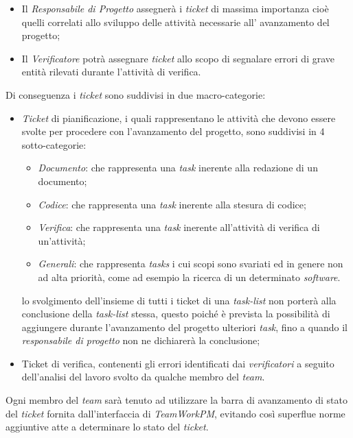 \begin{itemize}
\item Il \textit{Responsabile di Progetto} assegnerà i \textit{ticket} di massima importanza cioè quelli correlati allo sviluppo delle attività necessarie all' avanzamento del progetto;
\item Il \textit{Verificatore} potrà assegnare \textit{ticket} allo scopo di segnalare errori di grave entità rilevati durante l'attività di verifica.
\end{itemize}

Di conseguenza i \textit{ticket} sono suddivisi in due macro-categorie:
\begin{itemize}
\item \textit{Ticket} di pianificazione, i quali rappresentano le attività che devono essere svolte per procedere con l'avanzamento del progetto, sono suddivisi in 4 sotto-categorie:
\begin{itemize}
\item \emph{Documento}: che rappresenta una \textit{task} inerente alla redazione di un documento; 
\item \emph{Codice}: che rappresenta una \textit{task} inerente alla stesura di codice;
\item \emph{Verifica}: che rappresenta una \textit{task} inerente all'attività di verifica di un'attività;
\item \emph{Generali}: che rappresenta \textit{tasks} i cui scopi sono svariati ed in genere non ad alta priorità, come ad esempio la ricerca di un determinato \textit{software}.
\end{itemize}
lo svolgimento dell'insieme di tutti i ticket di una \textit{task-list} non porterà alla conclusione della \textit{task-list} stessa, questo poiché è prevista la possibilità di aggiungere durante l'avanzamento del progetto ulteriori \textit{task}, fino a quando il \textit{responsabile di progetto} non ne dichiarerà la conclusione;
\item Ticket di verifica, contenenti gli errori identificati dai \textit{verificatori} a seguito dell'analisi del lavoro svolto da qualche membro del \textit{team}.
\end{itemize}

Ogni membro del \textit{team} sarà tenuto ad utilizzare la barra di avanzamento di stato del \textit{ticket} fornita dall'interfaccia di \textit{TeamWorkPM}, evitando così superflue norme aggiuntive atte a determinare lo stato del \textit{ticket}.

